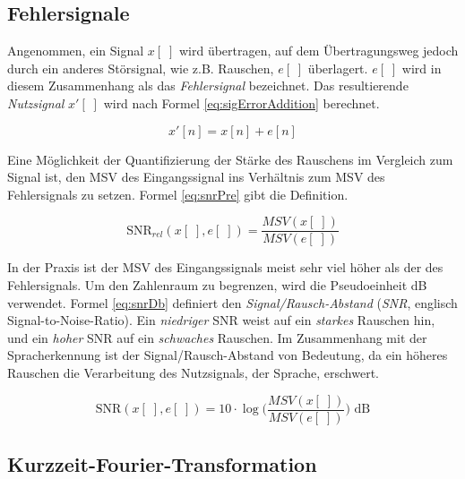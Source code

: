 
\subsection{Fehlersignale}

Angenommen, ein Signal $x[\;]$ wird übertragen, auf dem Übertragungsweg jedoch durch ein anderes Störsignal, wie z.B. Rauschen, $e[\;]$ überlagert. $e[\;]$ wird in diesem Zusammenhang als das \emph{Fehlersignal} bezeichnet. Das resultierende \emph{Nutzsignal} $x'[\;]$ wird nach Formel \ref{eq:sigErrorAddition} berechnet.\cite[S. 29]{dspMichigan}

\begin{equation}
x'[n] = x[n] + e[n]
\label{eq:sigErrorAddition}
\end{equation}

Eine Möglichkeit der Quantifizierung der Stärke des Rauschens im Vergleich zum Signal ist, den MSV des Eingangssignal ins Verhältnis zum MSV des Fehlersignals zu setzen. Formel \ref{eq:snrPre} gibt die Definition.


\begin{equation}
\text{SNR}_{rel}(x[\;],e[\;]) = \frac{MSV(x[\;])}{MSV(e[\;])}
\label{eq:snrPre}
\end{equation}

In der Praxis ist der MSV des Eingangssignals meist sehr viel höher als der des Fehlersignals. Um den Zahlenraum zu begrenzen, wird die Pseudoeinheit dB verwendet. Formel \ref{eq:snrDb} definiert den \emph{Signal/Rausch-Abstand} (\emph{SNR}, englisch Signal-to-Noise-Ratio). Ein \emph{niedriger} SNR weist auf ein \emph{starkes} Rauschen hin, und ein \emph{hoher} SNR auf ein \emph{schwaches} Rauschen. Im Zusammenhang mit der Spracherkennung ist der Signal/Rausch-Abstand von Bedeutung, da ein höheres Rauschen die Verarbeitung des Nutzsignals, der Sprache, erschwert.

\begin{equation}
\text{SNR}(x[\;],e[\;]) = 10 \cdot  \log \Big(\frac{MSV(x[\;])}{MSV(e[\;])} \Big) \text{ dB}
\label{eq:snrDb}
\end{equation}

\subsection{Kurzzeit-Fourier-Transformation}
\label{sec:stft}

